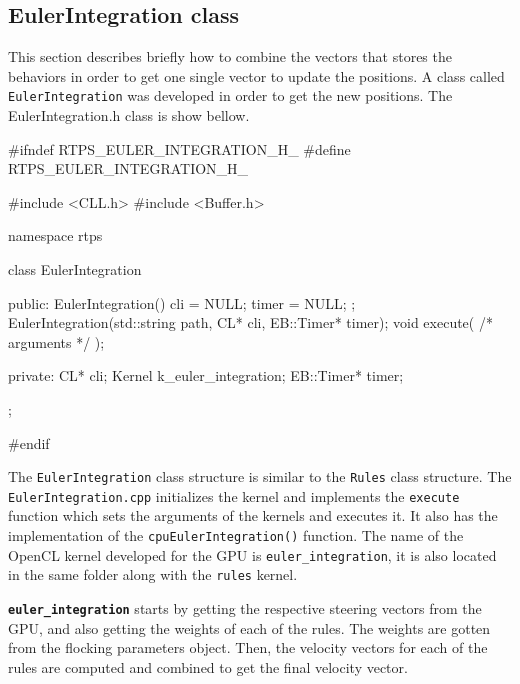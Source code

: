 


\subsection{EulerIntegration class}
This section describes briefly how to combine the vectors that stores the behaviors in order to get one single vector to update the positions. A class called \texttt{EulerIntegration} was developed in order to get the new positions. The {EulerIntegration.h} class is show bellow.

\begin{cppcode}{0}
#ifndef RTPS_EULER_INTEGRATION_H_
#define RTPS_EULER_INTEGRATION_H_

#include <CLL.h>
#include <Buffer.h>

namespace rtps
{
	class EulerIntegration
	{
		public:
			EulerIntegration() { cli = NULL; timer = NULL; };
	 		EulerIntegration(std::string path, CL* cli, EB::Timer* timer);
			void execute( /* arguments */ );

		private:
			CL* cli;
			Kernel k_euler_integration;
			EB::Timer* timer;
	};
}
#endif
\end{cppcode}

The \texttt{EulerIntegration} class structure is similar to the \texttt{Rules} class structure. The \texttt{EulerIntegration.cpp} initializes the kernel and implements the \texttt{execute} function which sets the arguments of the kernels and executes it. It also has the implementation of the \texttt{cpuEulerIntegration()} function. The name of the OpenCL kernel developed for the GPU is \texttt{euler\_integration}, it is also located in the same folder along with the \texttt{rules} kernel.

\texttt{\textbf{euler\_integration}} starts by getting the respective steering vectors from the GPU, and also getting the weights of each of the rules. The weights are gotten from the flocking parameters object. Then, the velocity vectors for each of the rules are computed and combined to get the final velocity vector.

